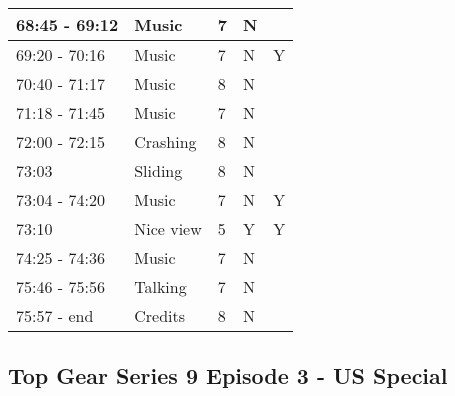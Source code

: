 \begin{longtable}{| p{70pt} | p{130pt} | p{45pt} | p{57pt} | p{60pt}|}
68:45 - 69:12     &     Music     &     7     &     N& \\\hline
69:20 - 70:16     &     Music     &     7     &     N&Y \\\hline
70:40 - 71:17     &     Music     &     8     &     N& \\\hline
71:18 - 71:45     &     Music     &     7     &     N& \\\hline
72:00 - 72:15     &     Crashing     &     8     &     N& \\\hline
73:03     &     Sliding     &     8     &     N& \\\hline
73:04 - 74:20     &     Music     &     7     &     N&Y \\\hline
73:10     &     Nice view     &     5     &     Y&Y \\\hline
74:25 - 74:36     &     Music     &     7     &     N& \\\hline
75:46 - 75:56     &     Talking     &     7     &     N& \\\hline
75:57 - end     &     Credits     &     8     &     N     &     \\\hline
\end{longtable}


\subsection{Top Gear Series 9 Episode 3 - US Special}
\label{sec:TopGearAmerica}

